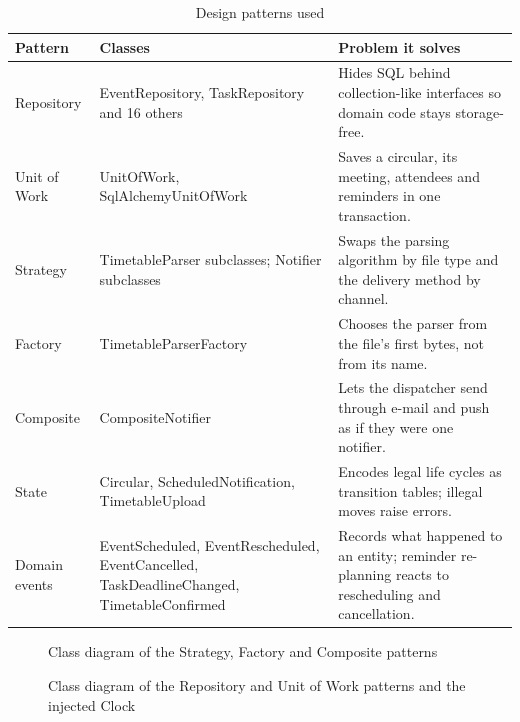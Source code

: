 {\small
{}
\begin{xltabular}{\textwidth}{|p{2.6cm}|p{4.6cm}|Y|}
\caption{Design patterns used}\\
\hline
\textbf{Pattern} & \textbf{Classes} & \textbf{Problem it solves} \\ \hline
Repository & EventRepository, TaskRepository and 16 others & Hides SQL behind collection-like interfaces so domain code stays storage-free. \\ \hline
Unit of Work & UnitOfWork, SqlAlchemyUnitOfWork & Saves a circular, its meeting, attendees and reminders in one transaction. \\ \hline
Strategy & TimetableParser subclasses; Notifier subclasses & Swaps the parsing algorithm by file type and the delivery method by channel. \\ \hline
Factory & TimetableParserFactory & Chooses the parser from the file's first bytes, not from its name. \\ \hline
Composite & CompositeNotifier & Lets the dispatcher send through e-mail and push as if they were one notifier. \\ \hline
State & Circular, ScheduledNotification, TimetableUpload & Encodes legal life cycles as transition tables; illegal moves raise errors. \\ \hline
Domain events & EventScheduled, EventRescheduled, EventCancelled, TaskDeadlineChanged, TimetableConfirmed & Records what happened to an entity; reminder re-planning reacts to rescheduling and cancellation. \\ \hline
\end{xltabular}}

\begin{figure}[!htbp]
  \centering
  \resizebox{\textwidth}{!}{}
  \caption{Class diagram of the Strategy, Factory and Composite patterns}
  \label{fig:classpatterns}
\end{figure}

\begin{figure}[!htbp]
  \centering
  \resizebox{\textwidth}{!}{}
  \caption{Class diagram of the Repository and Unit of Work patterns and the injected Clock}
  \label{fig:classpatternsb}
\end{figure}

